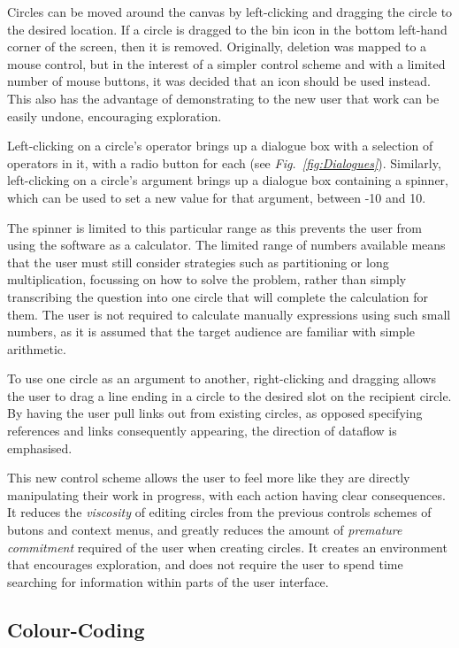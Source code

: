 \documentclass[12pt,twoside,notitlepage,xetex]{report}
\begin{document}
Circles can be moved around the canvas by left-clicking and dragging the circle to the desired location.  If a circle is dragged to the bin icon in the bottom left-hand corner of the screen, then it is removed.  Originally, deletion was mapped to a mouse control, but in the interest of a simpler control scheme and with a limited number of mouse buttons, it was decided that an icon should be used instead.  This also has the advantage of demonstrating to the new user that work can be easily undone, encouraging exploration.

Left-clicking on a circle's operator brings up a dialogue box with a selection of operators in it, with a radio button for each (see \emph{Fig.~\ref{fig:Dialogues}}).  Similarly, left-clicking on a circle's argument brings up a dialogue box containing a spinner, which can be used to set a new value for that argument, between -10 and 10.

The spinner is limited to this particular range as this prevents the user from using the software as a calculator.  The limited range of numbers available means that the user must still consider strategies such as partitioning or long multiplication, focussing on how to solve the problem, rather than simply transcribing the question into one circle that will complete the calculation for them.  The user is not required to calculate manually expressions using such small numbers, as it is assumed that the target audience are familiar with simple arithmetic.

To use one circle as an argument to another, right-clicking and dragging allows the user to drag a line ending in a circle to the desired slot on the recipient circle.  By having the user pull links out from existing circles, as opposed specifying references and links consequently appearing, the direction of dataflow is emphasised.

This new control scheme allows the user to feel more like they are directly manipulating their work in progress, with each action having clear consequences.  It reduces the \emph{viscosity} of editing circles from the previous controls schemes of butons and context menus, and greatly reduces the amount of \emph{premature commitment} required of the user when creating circles.  It creates an environment that encourages exploration, and does not require the user to spend time searching for information within parts of the user interface.

\subsection{Colour-Coding}
\end{document}
